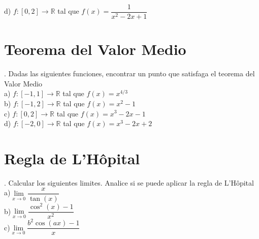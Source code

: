 \documentclass[letterpaper]{article}
\begin{document}

d) $ f : [0,2] \longrightarrow \mathds{R} $ tal que $ f(x) =\dfrac{1}{x^{2} - 2x + 1} $\\


\section*{Teorema del Valor Medio}

. Dadas las siguientes funciones, encontrar un punto que satisfaga el teorema del Valor Medio \\

a) $ f : [-1,1] \longrightarrow \mathds{R} $ tal que $ f(x) = x^{4/3} $\\


b) $ f : [-1,2] \longrightarrow \mathds{R} $ tal que $ f(x) = x^{2} -1$\\


c) $ f : [0,2] \longrightarrow \mathds{R} $ tal que $ f(x) = x^{3} - 2x -1 $\\


d) $ f : [-2,0] \longrightarrow \mathds{R} $ tal que $ f(x) = x^{3} - 2x + 2 $\\


\section*{Regla de L’Hôpital}

. Calcular los siguientes limites. Analice si se puede aplicar la regla de L’Hôpital\\

a)$ \lim\limits_{ x \rightarrow 0} \dfrac{x}{\tan(x)} $\\


b)$ \lim\limits_{ x \rightarrow 0} \dfrac{\cos^{2}(x) -1}{x^{2}} $\\


c)$ \lim\limits_{ x \rightarrow 0} \dfrac{b^{2}\cos(ax) -1}{x} $\\

\end{document}
